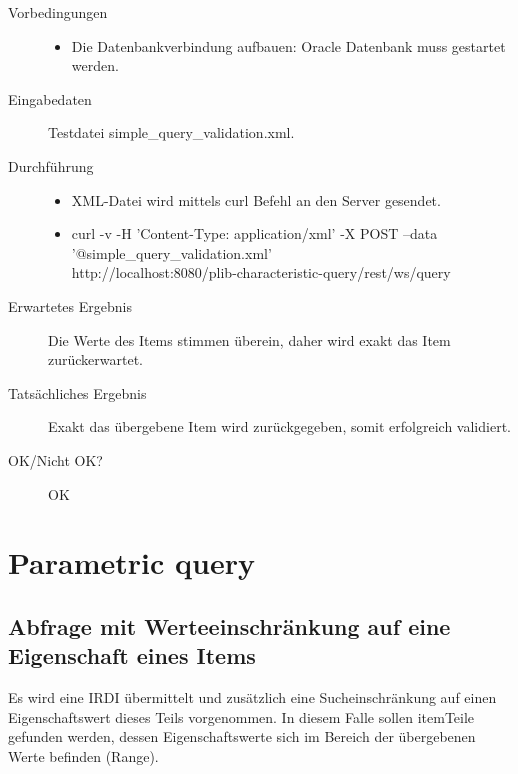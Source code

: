 \begin{description}
\item[Vorbedingungen] 
  \begin{itemize}
   \item Die Datenbankverbindung aufbauen: Oracle Datenbank muss gestartet werden.
  \end{itemize}
\item[Eingabedaten] Testdatei simple\_query\_validation.xml. 
\item[Durchführung]
   \begin{itemize}
   \item XML-Datei wird mittels curl Befehl an den Server gesendet.
   \item curl -v -H 'Content-Type: application/xml' -X POST --data \\
   '@simple\_query\_validation.xml' \\
   http://localhost:8080/plib-characteristic-query/rest/ws/query
  \end{itemize}
\item[Erwartetes Ergebnis] Die Werte des Items stimmen überein, daher wird exakt das Item zurückerwartet.  
\item[Tatsächliches Ergebnis] Exakt das übergebene Item wird zurückgegeben, somit erfolgreich validiert. 
\item[OK/Nicht OK?] OK
\end{description}

\section{Parametric query}

\subsection{Abfrage mit Werteeinschränkung auf eine Eigenschaft eines Items}

Es wird eine IRDI übermittelt und zusätzlich eine Sucheinschränkung auf einen Eigenschaftswert dieses Teils vorgenommen. In diesem Falle sollen \gls{item}{Teile} gefunden werden, dessen Eigenschaftswerte sich im Bereich der übergebenen Werte befinden (Range). 

